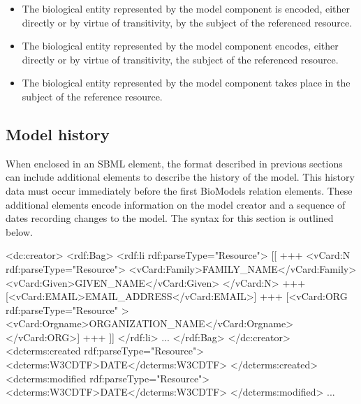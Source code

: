 \begin{itemize}
\item {} The biological entity represented
  by the model component is encoded, either directly or by virtue
  of transitivity, by the subject of the referenced resource.

\item {} The biological entity represented by
  the model component encodes, either directly or by virtue of
  transitivity, the subject of the referenced resource.

\item {}  The biological entity represented by the model component takes place in the subject of the reference resource.


\end{itemize}



\subsection{Model history}
\label{sec:model-history-annotation}

When enclosed in an SBML \Model element, the format described in
previous sections can include additional elements to describe the
history of the model.  This history data must occur immediately
before the first BioModels relation elements.  These additional
elements encode information on the model creator and a sequence of
dates recording changes to the model. The syntax for this section
is outlined below.
 

\begin{example}
<dc:creator>
  <rdf:Bag>
    <rdf:li rdf:parseType="Resource">
      [[
      +++
      <vCard:N rdf:parseType="Resource">
        <vCard:Family>FAMILY_NAME</vCard:Family>
        <vCard:Given>GIVEN_NAME</vCard:Given>
      </vCard:N>
      +++
      [<vCard:EMAIL>EMAIL_ADDRESS</vCard:EMAIL>]
      +++
      [<vCard:ORG rdf:parseType="Resource" >
        <vCard:Orgname>ORGANIZATION_NAME</vCard:Orgname>
      </vCard:ORG>]
      +++
      ]]
    </rdf:li>
    ...
  </rdf:Bag>
</dc:creator>
<dcterms:created rdf:parseType="Resource">
  <dcterms:W3CDTF>DATE</dcterms:W3CDTF>
</dcterms:created>
<dcterms:modified rdf:parseType="Resource">
  <dcterms:W3CDTF>DATE</dcterms:W3CDTF>
</dcterms:modified>
...
\end{example}

